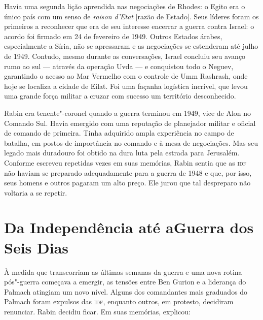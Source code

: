 Havia uma segunda lição aprendida nas negociações de Rhodes: o Egito era
o único país com um senso de \textit{raison d'Etat} {[}razão de Estado{]}. Seus líderes foram os
primeiros a reconhecer que era de seu interesse encerrar a guerra contra
Israel: o acordo foi firmado em 24 de fevereiro de 1949. Outros Estados
árabes, especialmente a Síria, não se apressaram e as negociações se
estenderam até julho de 1949. Contudo, mesmo durante as conversações, Israel
concluiu seu avanço rumo ao sul --- através da operação Uvda --- e
conquistou todo o Neguev, garantindo o acesso ao Mar Vermelho com o
controle de Umm Rashrash, onde hoje se localiza a cidade de Eilat. Foi
uma façanha logística incrível, que levou uma grande força militar a
cruzar com sucesso um território desconhecido.

Rabin era tenente"-coronel quando a guerra terminou em 1949, vice de Alon
no Comando Sul. Havia emergido com uma reputação de planejador militar e
oficial de comando de primeira. Tinha adquirido ampla experiência no
campo de batalha, em postos de importância no comando e à mesa de
negociações. Mas seu legado mais duradouro foi obtido na dura
luta pela estrada para Jerusalém. Conforme escreveu repetidas vezes em
suas memórias, Rabin sentia que as \textsc{idf} não haviam se preparado
adequadamente para a guerra de 1948 e que, por isso, seus homens e
outros pagaram um alto preço. Ele jurou que tal despreparo não voltaria
a se repetir.

\chapter*{Da Independência até a\break Guerra dos Seis Dias\smallskip{}}

À medida que transcorriam as últimas semanas da guerra e uma nova rotina
pós"-guerra começava a emergir, as tensões entre Ben Gurion e a liderança
do Palmach atingiam um novo nível. Alguns dos comandantes mais graduados
do Palmach foram expulsos das \textsc{idf}, enquanto outros, em protesto,
decidiram renunciar. Rabin decidiu ficar. Em suas memórias, explicou:

